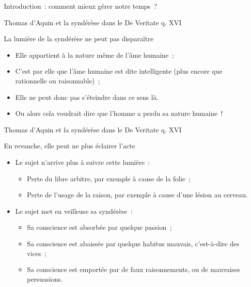 \documentclass[11pt,xcolor=dvipsname,ignorenonframetext,handout]{beamer}
\begin{document}
\begin{frame}{Introduction~: comment mieux gérer notre temps~?}
\begin{frame}{Thomas d'Aquin et la syndérèse dans le De Veritate q. XVI}
    \begin{exampleblock}{La lumière de la syndérèse ne peut pas disparaître}
        \begin{itemize}
            \rightskip=0pt\leftskip=0pt
            \item Elle appartient à la nature même de l'âme humaine~;
            \item C'est par elle que l'âme humaine est dite intelligente (plus encore que rationnelle ou raisonnable)~;
            \item Elle ne peut donc pas s'éteindre dans ce sens là.
            \item Ou alors cela voudrait dire que l'homme a perdu sa nature humaine~!
        \end{itemize}
    \end{exampleblock}
\end{frame}
\begin{frame}{Thomas d'Aquin et la syndérèse dans le De Veritate q. XVI}
    \begin{alertblock}{En revanche, elle peut ne plus éclairer l'acte}
        \begin{itemize}
            \rightskip=0pt\leftskip=0pt
            \item Le sujet n'arrive plus à suivre cette lumière~:
            \begin{itemize}
                \rightskip=0pt\leftskip=0pt
                \item Perte du libre arbitre, par exemple à cause de la folie~;
                \item Perte de l'usage de la raison, par exemple à cause d'une lésion au cerveau.
            \end{itemize}
            \item Le sujet met en veilleuse sa syndérèse~:
            \begin{itemize}
                \rightskip=0pt\leftskip=0pt
                \item Sa conscience est absorbée par quelque passion~;
                \item Sa conscience est abaissée par quelque habitus mauvais, c'est-à-dire des vices~;
                \item Sa conscience est emportée par de faux raisonnements, ou de mauvaises persuasions.
            \end{itemize}
        \end{itemize}
    \end{alertblock}
\end{frame}

\end{frame}
\end{document}
